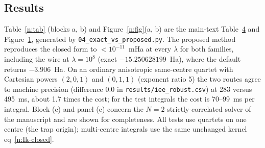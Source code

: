 \documentclass[11pt]{article}
\begin{document}
\subsection{Results}
Table~\ref{n:tab} (blocks a, b) and Figure~\ref{n:fig}(a, b) are the main-text Table~\href{main.pdf\#table.4}{4}
and Figure~\href{main.pdf\#figure.caption.5}{1}, generated by \texttt{04\_exact\_vs\_proposed.py}.  The proposed method
reproduces the closed form to $<10^{-11}$~mHa at every $\lambda$ for both families, including the wire at
$\lambda=10^8$ (exact $-15.250628199$~Ha), where the default returns $-3.906$~Ha.  On an ordinary anisotropic
same-centre quartet with Cartesian powers $(2,0,1)$ and $(0,1,1)$ (exponent ratio 5) the two routes agree to
machine precision (difference $0.0$ in \texttt{results/iee\_robust.csv}) at 283 versus 495~ms, about 1.7 times
the cost; for the test integrals the cost is 70--99~ms per integral.  Block (c) and panel (c) concern the
$N=2$ strictly-correlated solver of the manuscript and are shown for completeness.  All tests use quartets on
one centre (the trap origin); multi-centre integrals use the same unchanged kernel eq~\ref{n:Ik-closed}.
\end{document}

